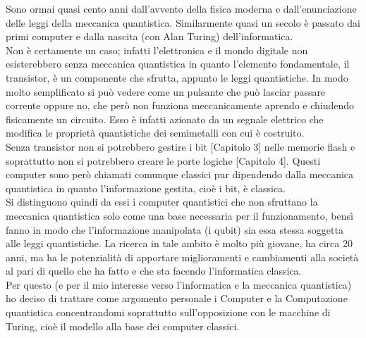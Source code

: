 Sono ormai quasi cento anni dall'avvento della fisica moderna e dall'enunciazione delle leggi della meccanica quantistica. Similarmente quasi un secolo è passato dai primi computer e dalla nascita (con Alan Turing) dell'informatica.\\
Non è certamente un caso; infatti l'elettronica e il mondo digitale non esisterebbero senza meccanica quantistica in quanto l'elemento fondamentale, il transistor, è un componente che sfrutta, appunto le leggi quantistiche. In modo molto semplificato si può vedere come un pulsante che può lasciar passare corrente oppure no, che però non funziona meccanicamente aprendo e chiudendo fisicamente un circuito. Esso è infatti azionato da un segnale elettrico che modifica le proprietà quantistiche dei semimetalli con cui è costruito.\\
Senza transistor non si potrebbero gestire i bit [Capitolo 3] nelle memorie flash e soprattutto non si potrebbero creare le porte logiche [Capitolo 4].
Questi computer sono però chiamati comunque classici pur dipendendo dalla meccanica quantistica in quanto l'informazione gestita, cioè i bit, è classica.\\
Si distinguono quindi da essi i computer quantistici che non sfruttano la meccanica quantistica solo come una base necessaria per il funzionamento, bensì fanno in modo che l'informazione manipolata (i qubit) sia essa stessa soggetta alle leggi quantistiche. La ricerca in tale ambito è molto più giovane, ha circa 20 anni, ma ha le potenzialità di apportare miglioramenti e cambiamenti alla società al pari di quello che ha fatto e che sta facendo l'informatica classica.\\
Per questo (e per il mio interesse verso l'informatica e la meccanica quantistica) ho deciso di trattare come argomento personale i Computer e la Computazione quantistica concentrandomi soprattutto sull'opposizione con le macchine di Turing, cioè il modello alla base dei computer classici.